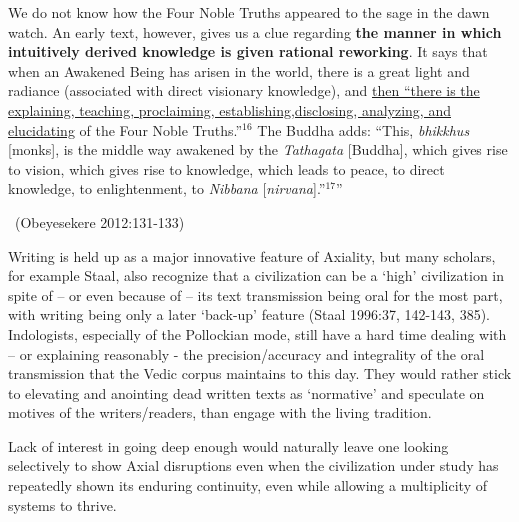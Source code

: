 \begin{myquote}
We do not know how the Four Noble Truths appeared to the sage in the dawn watch. An early text, however, gives us a clue regarding \textbf{the manner in which intuitively derived knowledge is given rational reworking}. It says that when an Awakened Being has arisen in the world, there is a great light and radiance (associated with direct visionary knowledge), and \underline{then “there is the explaining, teaching, proclaiming, establishing,}\break \underline{disclosing, analyzing, and elucidating} of the Four Noble Truths.”$^{16}$ The Buddha adds: “This, \textit{bhikkhus} [monks], is the middle way awakened by the \textit{Tathagata} [Buddha], which gives rise to vision, which gives rise to knowledge, which leads to peace, to direct knowledge, to enlightenment, to \textit{Nibbana} [\textit{nirvana}].”$^{17}$” 

~\hfill (Obeyesekere 2012:131-133)
\end{myquote}

Writing is held up as a major innovative feature of Axiality, but many scholars, for example Staal, also recognize that a civilization can be a ‘high’ civilization in spite of – or even because of – its text transmission being oral for the most part, with writing being only a later ‘back-up’ feature (Staal 1996:37, 142-143, 385). Indologists, especially of the Pollockian mode, still have a hard time dealing with – or explaining reasonably - the precision/accuracy and integrality of the oral transmission that the Vedic corpus maintains to this day. They would rather stick to elevating and anointing dead written texts as ‘normative’ and speculate on motives of the writers/readers, than engage with the living tradition.

Lack of interest in going deep enough would naturally leave one looking selectively to show Axial disruptions even when the civilization under study has repeatedly shown its enduring continuity, even while allowing a multiplicity of systems to thrive.

